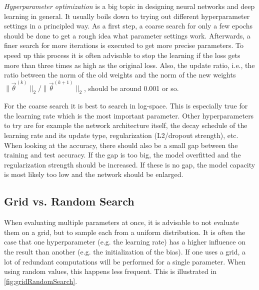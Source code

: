 			\emph{Hyperparameter optimization} is a big topic in designing neural networks and deep learning in general. It usually boils down to trying out different hyperparameter settings in a principled way. As a first step, a coarse search for only a few epochs should be done to get a rough idea what parameter settings work. Afterwards, a finer search for more iterations is executed to get more precise parameters. To speed up this process it is often advisable to stop the learning if the loss gets more than three times as high as the original loss. Also, the update ratio, i.e., the ratio between the norm of the old weights and the norm of the new weights \( \lVert \vec{\theta}^{(k)} \rVert_2 / \lVert \vec{\theta}^{(k + 1)} \rVert_2 \), should be around \num{0.001} or so.

			For the coarse search it is best to search in log-space. This is especially true for the learning rate which is the most important parameter. Other hyperparameters to try are for example the network architecture itself, the decay schedule of the learning rate and its update type, regularization (L2/dropout strength), etc. When looking at the accuracy, there should also be a small gap between the training and test accuracy. If the gap is too big, the model overfitted and the regularization strength should be increased. If these is no gap, the model capacity is most likely too low and the network should be enlarged.

			\subsection{Grid vs. Random Search}
				When evaluating multiple parameters at once, it is advisable to not evaluate them on a grid, but to sample each from a uniform distribution. It is often the case that one hyperparameter (e.g. the learning rate) has a higher influence on the result than another (e.g. the initialization of the bias). If one uses a grid, a lot of redundant computations will be performed for a single parameter. When using random values, this happens less frequent. This is illustrated in \autoref{fig:gridRandomSearch}.

